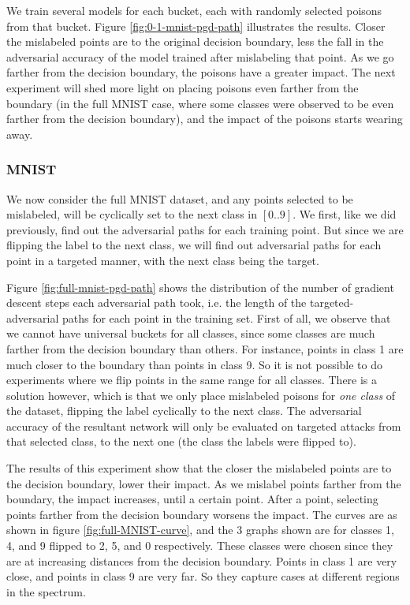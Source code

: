 \documentclass{ociamthesis}
\begin{document}
    We train several models for each bucket, each with randomly selected poisons
    from that bucket. Figure \ref{fig:0-1-mnist-pgd-path} illustrates the results.
    Closer the mislabeled points are to the original decision boundary, less the
    fall in the adversarial accuracy of the model trained after mislabeling that
    point. As we go farther from the decision boundary, the poisons have a
    greater impact. The next experiment will shed more light on placing poisons
    even farther from the boundary (in the full MNIST case, where some classes
    were observed to be even farther from the decision boundary), and the impact
    of the poisons starts wearing away.

    

\subsubsection{MNIST}
    We now consider the full MNIST dataset, and any points selected to be
    mislabeled, will be cyclically set to the next class in $[0..9]$. We first,
    like we did previously, find out the adversarial paths for each training
    point. But since we are flipping the label to the next class, we will find
    out adversarial paths for each point in a targeted manner, with the next
    class being the target.

    Figure \ref{fig:full-mnist-pgd-path} shows the distribution of the number of
    gradient descent steps each adversarial path took, i.e. the length of the
    targeted-adversarial paths for each point in the training set. First of all,
    we observe that we cannot have universal buckets for all classes, since some
    classes are much farther from the decision boundary than others. For
    instance, points in class 1 are much closer to the boundary than points in
    class 9. So it is not possible to do experiments where we flip points in the
    same range for all classes. There is a solution however, which is that we
    only place mislabeled poisons for \emph{one class} of the dataset, flipping
    the label cyclically to the next class. The adversarial accuracy of the
    resultant network will only be evaluated on targeted attacks from that
    selected class, to the next one (the class the labels were flipped to).

    The results of this experiment show that the closer the mislabeled points
    are to the decision boundary, lower their impact. As we mislabel points
    farther from the boundary, the impact increases, until a certain point.
    After a point, selecting points farther from the decision boundary worsens
    the impact. The curves are as shown in figure \ref{fig:full-MNIST-curve},
    and the 3 graphs shown are for classes 1, 4, and 9 flipped to 2, 5, and 0
    respectively. These classes were chosen since they are at increasing
    distances from the decision boundary. Points in class 1 are very close, and
    points in class 9 are very far. So they capture cases at different regions
    in the spectrum.
\end{document}
